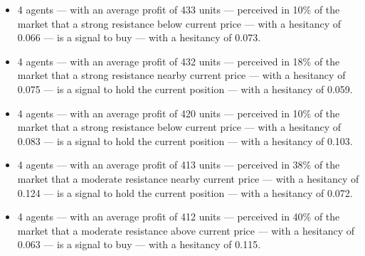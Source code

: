{\small
  \begin{itemize}
  \item 4 agents — with an average profit of 433 units — perceived in 10\% of
    the market that a strong resistance below current price — with a hesitancy
    of 0.066 — is a signal to buy — with a hesitancy of 0.073.
  \item 4 agents — with an average profit of 432 units — perceived in 18\% of
    the market that a strong resistance nearby current price — with a hesitancy
    of 0.075 — is a signal to hold the current position — with a hesitancy of
    0.059.
  \item 4 agents — with an average profit of 420 units — perceived in 10\% of
    the market that a strong resistance below current price — with a hesitancy
    of 0.083 — is a signal to hold the current position — with a hesitancy of
    0.103.
  \item 4 agents — with an average profit of 413 units — perceived in 38\% of
    the market that a moderate resistance nearby current price — with a
    hesitancy of 0.124 — is a signal to hold the current position — with a
    hesitancy of 0.072.
  \item 4 agents — with an average profit of 412 units — perceived in 40\% of
    the market that a moderate resistance above current price — with a hesitancy
    of 0.063 — is a signal to buy — with a hesitancy of 0.115.
  \end{itemize}
}
